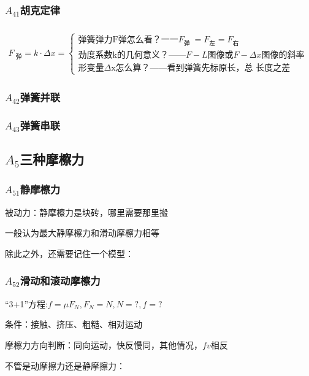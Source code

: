 \documentclass[lang=cn,10pt]{elegantbook}
\begin{document}
	\subsubsection{$A_{41}$胡克定律}
	$\begin{aligned}\\F_{\text{ 弹}}=k\cdot\Delta x=\begin{cases}\text{弹簧弹力F}\text{弹怎么看？一一}F_{\text{弹 }}=F_\text{左}=F_\text{右}\\\text{劲度系数k的几何意义？——}F-L\text{图像或}F-\Delta x\text{图像的斜率}\\\text{形变量$\Delta $x怎么算？——看到弹簧先标原长，总 长度之差}\end{cases}\end{aligned}$
	\subsubsection{$A_{42}$弹簧并联}
	\vspace{2cm}
	\subsubsection{$A_{43}$弹簧串联}
	\vspace{2cm}
	\subsection{$A_{5}$三种摩檫力}
	\subsubsection{$A_{51}$静摩檫力}
	被动力：静摩檫力是块砖，哪里需要那里搬
	\vspace{2cm}
	
	\begin{remark}
		一般认为最大静摩檫力和滑动摩檫力相等
	\end{remark}
	除此之外，还需要记住一个模型：
	\vspace{2.5cm}
	\subsubsection{$A_{52}$滑动和滚动摩檫力  }
	“3+1”方程:$f=\mu F_N,F_N=N,N=?,f=?$
	
	条件：接触、挤压、粗糙、相对运动
	\vspace{3cm}
	
	摩檫力方向判断：同向运动，快反慢同，其他情况，$fv$相反
	\vspace{3cm}
	
	不管是动摩擦力还是静摩擦力：
	
\end{document}
